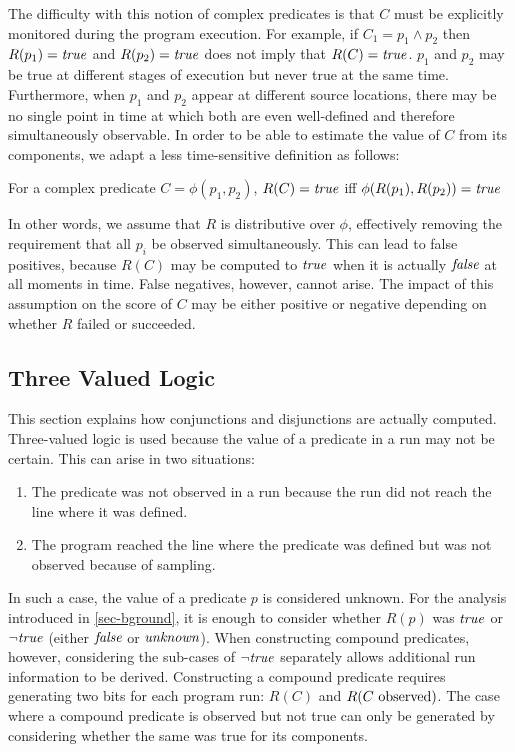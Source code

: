 The difficulty with this notion of complex predicates is that $C$ must be explicitly monitored during the program execution.  For example, if $C_1 = p_1 \wedge p_2$ then $R(p_1) = \mathit{true}$ and $R(p_2) = \mathit{true}$ does not imply that $R(C) = \mathit{true}$.  $p_1$ and $p_2$ may be true at different stages of execution but never true at the same time.  Furthermore, when $p_1$ and $p_2$ appear at different source locations, there may be no single point in time at which both are even well-defined and therefore simultaneously observable.  In order to be able to estimate the value of $C$ from its components, we adapt a less time-sensitive definition as follows:
\begin{defn}
\label{dfn2}
For a complex predicate $C = \phi(p_1, p_2)$, $R(C) = \mathit{true}$ iff $\phi(R(p_1), R(p_2)) = \mathit{true}$
\end{defn}

In other words, we assume that $R$ is distributive over $\phi$, effectively removing the requirement that all $p_i$ be observed simultaneously.  This can lead to false positives, because $R(C)$ may be computed to $\mathit{true}$ when it is actually $\mathit{false}$ at all moments in time.  False negatives, however, cannot arise.  The impact of this assumption on the score of $C$ may be either positive or negative depending on whether $R$ failed or succeeded.

\subsection{Three Valued Logic}
\label{sec-tvl}
This section explains how conjunctions and disjunctions are actually computed.  Three-valued logic is used because the value of a predicate in a run may not be certain. This can arise in two situations:
\begin{enumerate}
\item The predicate was not observed in a run because the run did not reach the line where it was defined.
\item The program reached the line where the predicate was defined but was not observed because of sampling.
\end{enumerate}


In such a case, the value of a predicate $p$ is considered unknown.  For the 
analysis introduced in \autoref{sec-bground}, it is enough to consider whether 
$R(p)$ was $\mathit{true}$ or $\neg \mathit{true}$ (either $\mathit{false}$ or $\mathit{unknown}$).  When 
constructing compound predicates, however, considering the sub-cases of 
$\neg \mathit{true}$ separately allows additional run information to be derived.  
Constructing a compound predicate requires generating two bits for each program
run: $R(C)$ and $R(\text{$C$ observed})$.  The case where a compound predicate is observed but not
true can only be generated by considering whether the same was true for its
components.

